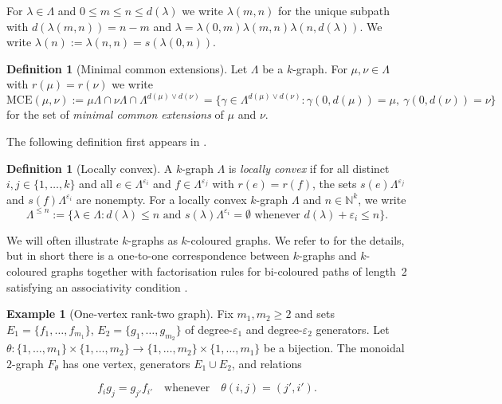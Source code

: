 \documentclass[12pt]{amsart}
\theoremstyle{plain}
\theoremstyle{definition}
\newtheorem{definition}[theorem]{Definition}
\newtheorem{example}[theorem]{Example}
\theoremstyle{remark}
\begin{document}
For $\lambda\in\Lambda$ and $0\leq m\leq n\leq d(\lambda)$ we write
$\lambda(m,n)$ for the unique subpath with $d(\lambda(m,n))=n-m$ and
$\lambda=\lambda(0,m)\lambda(m,n)\lambda(n,d(\lambda))$. We write
$\lambda(n):=\lambda(n,n)=s(\lambda(0,n))$.


\begin{definition}[Minimal common extensions]
Let $\Lambda$ be a $k$-graph. For $\mu,\nu\in\Lambda$ with $r(\mu)=r(\nu)$ we write
\[
\mathrm{MCE}(\mu,\nu):=\mu\Lambda\cap\nu\Lambda\cap\Lambda^{d(\mu)\vee d(\nu)}
=\{\gamma\in\Lambda^{d(\mu)\vee d(\nu)}:\gamma(0,d(\mu))=\mu,\ \gamma(0,d(\nu))=\nu\}
\]
for the set of \emph{minimal common extensions} of $\mu$ and $\nu$. 
\end{definition}

\noindent
The following definition first appears in \cite[Definition 3.9]{RSY1}.

\begin{definition}[Locally convex]
A $k$-graph $\Lambda$ is \textit{locally convex} if for all distinct
$i,j\in\{1,\dots,k\}$ and all $e \in \Lambda^{\varepsilon_i}$ and
$f \in \Lambda^{\varepsilon_j}$ with $r(e) = r(f)$, the sets
$s(e)\Lambda^{\varepsilon_j}$ and $s(f)\Lambda^{\varepsilon_i}$ are nonempty.
For a locally convex $k$-graph $\Lambda$ and 
$n \in \mathbb{N}^k$, we write 
\[
\Lambda^{\leq n} := \{ \lambda \in \Lambda : d(\lambda) \leq n 
\text{ and } s ( \lambda ) \Lambda^{\varepsilon_i} = \emptyset 
\text{ whenever } d  (\lambda ) + \varepsilon_i \leq n \} .
\]
\end{definition}


\noindent
We will often illustrate $k$-graphs as $k$-coloured graphs. We refer to \cite{HRSW}
for the details, but in short there is a one-to-one correspondence between $k$-graphs and
$k$-coloured graphs together with factorisation rules for bi-coloured paths of length~2 satisfying
an associativity condition \cite[Equation~(3.2)]{HRSW}.

\begin{example}[One-vertex rank-two graph]\label{ex:rank2}
Fix $m_1,m_2\geq 2$ and sets $E_1=\{f_1,\dots,f_{m_1}\}$,
$E_2=\{g_1,\dots,g_{m_2}\}$ of degree-$\varepsilon_1$ and degree-$\varepsilon_2$ generators.
Let $\theta:\{1,\dots,m_1\}\times\{1,\dots,m_2\}\to
\{1,\dots,m_2\}\times\{1,\dots,m_1\}$ be a bijection. The monoidal
$2$-graph $F_\theta$ has one vertex, generators $E_1\cup E_2$,
and relations


\[
f_i g_j = g_{j'} f_{i'}\quad\text{whenever}\quad
\theta(i,j)=(j',i').
\]


\end{example}
\end{document}
